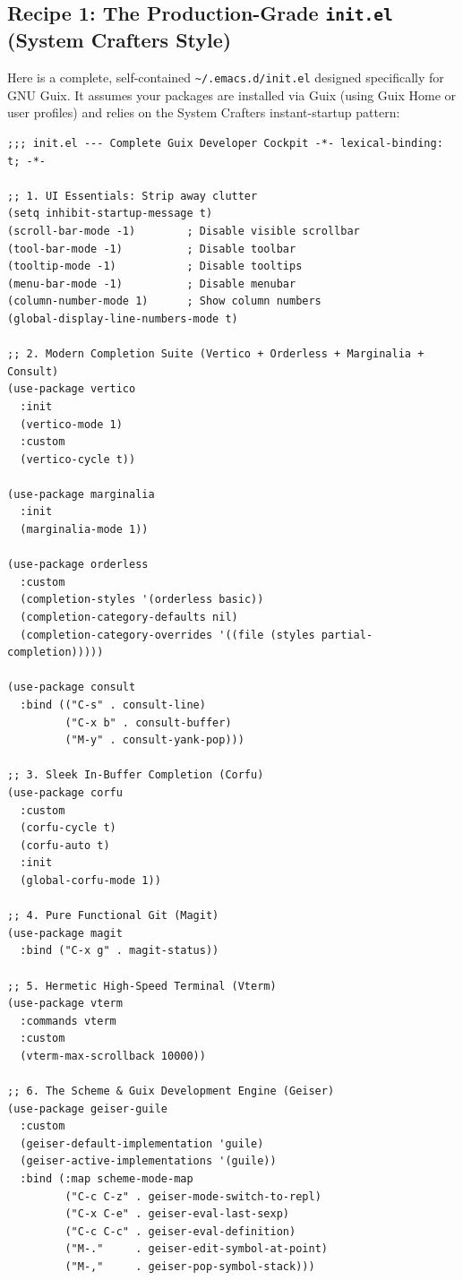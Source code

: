 \subsection{Recipe 1: The Production-Grade \texttt{init.el} (System Crafters Style)}

Here is a complete, self-contained \texttt{\textasciitilde/.emacs.d/init.el} designed specifically for GNU Guix. It assumes your packages are installed via Guix (using Guix Home or user profiles) and relies on the System Crafters instant-startup pattern:

\begin{lstlisting}[style=guixscheme]
;;; init.el --- Complete Guix Developer Cockpit -*- lexical-binding: t; -*-

;; 1. UI Essentials: Strip away clutter
(setq inhibit-startup-message t)
(scroll-bar-mode -1)        ; Disable visible scrollbar
(tool-bar-mode -1)          ; Disable toolbar
(tooltip-mode -1)           ; Disable tooltips
(menu-bar-mode -1)          ; Disable menubar
(column-number-mode 1)      ; Show column numbers
(global-display-line-numbers-mode t)

;; 2. Modern Completion Suite (Vertico + Orderless + Marginalia + Consult)
(use-package vertico
  :init
  (vertico-mode 1)
  :custom
  (vertico-cycle t))

(use-package marginalia
  :init
  (marginalia-mode 1))

(use-package orderless
  :custom
  (completion-styles '(orderless basic))
  (completion-category-defaults nil)
  (completion-category-overrides '((file (styles partial-completion)))))

(use-package consult
  :bind (("C-s" . consult-line)
         ("C-x b" . consult-buffer)
         ("M-y" . consult-yank-pop)))

;; 3. Sleek In-Buffer Completion (Corfu)
(use-package corfu
  :custom
  (corfu-cycle t)
  (corfu-auto t)
  :init
  (global-corfu-mode 1))

;; 4. Pure Functional Git (Magit)
(use-package magit
  :bind ("C-x g" . magit-status))

;; 5. Hermetic High-Speed Terminal (Vterm)
(use-package vterm
  :commands vterm
  :custom
  (vterm-max-scrollback 10000))

;; 6. The Scheme & Guix Development Engine (Geiser)
(use-package geiser-guile
  :custom
  (geiser-default-implementation 'guile)
  (geiser-active-implementations '(guile))
  :bind (:map scheme-mode-map
         ("C-c C-z" . geiser-mode-switch-to-repl)
         ("C-x C-e" . geiser-eval-last-sexp)
         ("C-c C-c" . geiser-eval-definition)
         ("M-."     . geiser-edit-symbol-at-point)
         ("M-,"     . geiser-pop-symbol-stack)))


\end{lstlisting}
